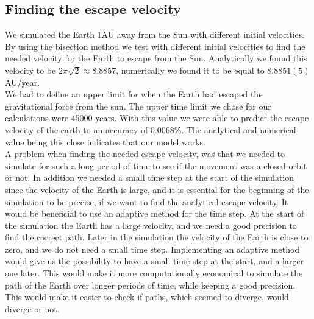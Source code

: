 \documentclass[%
 reprint,
nofootinbib,
aps,
]{revtex4-1}
\begin{document}
\subsection{Finding the escape velocity}
We simulated the Earth $1$AU away from the Sun with different initial velocities. By using the bisection method we test with different initial velocities to find the needed velocity for the Earth to escape from the Sun. Analytically we found this velocity to be $2\pi\sqrt{2}\approx 8.8857$, numerically we found it to be equal to $8.8851(5)$AU/year.\\
We had to define an upper limit for when the Earth had escaped the gravitational force from the sun. The upper time limit we chose for our calculations were $45000$ years. With this value we were able to predict the escape velocity of the earth to an accuracy of $0.0068\%$. The analytical and numerical value being this close indicates that our model works.
\\
A problem when finding the needed escape velocity, was that we needed to simulate for such a long period of time to see if the movement was a closed orbit or not. In addition we needed a small time step at the start of the simulation since the velocity of the Earth is large, and it is essential for the beginning of the simulation to be precise, if we want to find the analytical escape velocity. It would be beneficial to use an adaptive method for the time step. At the start of the simulation the Earth has a large velocity, and we need a good precision to find the correct path. Later in the simulation the velocity of the Earth is close to zero, and we do not need a small time step. Implementing an adaptive method would give us the possibility to have a small time step at the start, and a larger one later. This would make it more computationally economical to simulate the path of the Earth over longer periods of time, while keeping a good precision. This would make it easier to check if paths, which seemed to diverge, would diverge or not.
\end{document}
